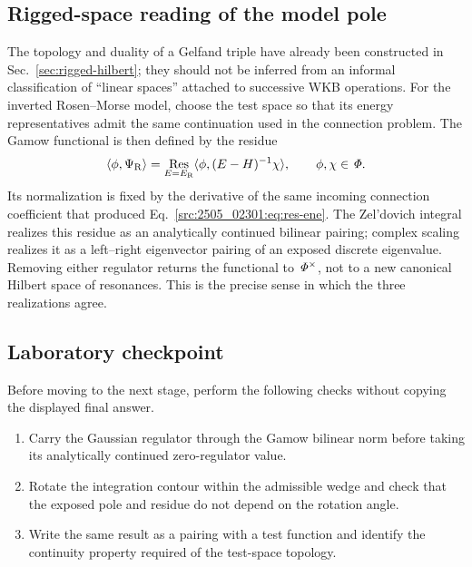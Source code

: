 \subsection{Rigged-space reading of the model pole}
The topology and duality of a Gelfand triple have already been constructed in
Sec.~\ref{sec:rigged-hilbert}; they should not be inferred from an informal
classification of ``linear spaces'' attached to successive WKB operations.
For the inverted Rosen--Morse model, choose the test space so that its energy
representatives admit the same continuation used in the connection problem.
The Gamow functional is then defined by the residue
\begin{equation}
  \langle \phi,\Psi_{\mathrm R}\rangle
  =\operatorname*{Res}_{E=E_{\mathrm{R}}}
  \langle \phi,(E-H)^{-1}\chi\rangle,
  \qquad \phi,\chi\in\mathit{\Phi} .
  \label{src:2505_02301:eq:model-gamow-functional}
\end{equation}
Its normalization is fixed by the derivative of the same incoming connection
coefficient that produced Eq.~\eqref{src:2505_02301:eq:res-ene}.  The
Zel'dovich integral realizes this residue as an analytically continued
bilinear pairing; complex scaling realizes it as a left--right eigenvector
pairing of an exposed discrete eigenvalue.  Removing either regulator returns
the functional to $\mathit{\Phi}^\times$, not to a new canonical Hilbert space of
resonances.  This is the precise sense in which the three realizations agree.

\subsection*{Laboratory checkpoint}
Before moving to the next stage, perform the following checks without copying
the displayed final answer.
\begin{enumerate}
  \item Carry the Gaussian regulator through the Gamow bilinear norm before taking its analytically continued zero-regulator value.
  \item Rotate the integration contour within the admissible wedge and check that the exposed pole and residue do not depend on the rotation angle.
  \item Write the same result as a pairing with a test function and identify the continuity property required of the test-space topology.
\end{enumerate}
